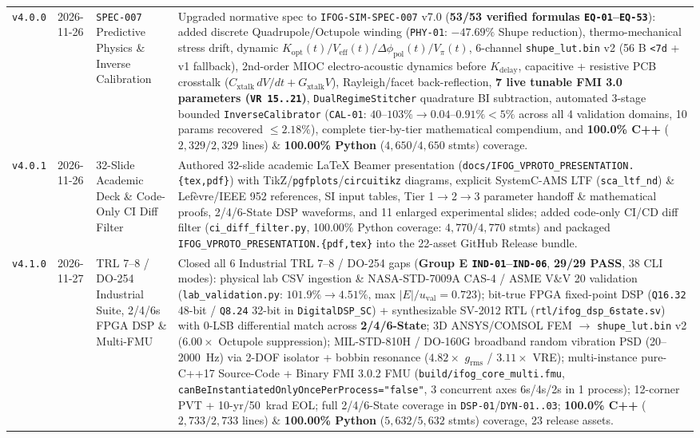 \documentclass[11pt,a4paper]{article}
\begin{document}
\begin{tabularx}{\textwidth}{@{}p{1.4cm} p{2.0cm} p{3.2cm} X@{}}
\texttt{v4.0.0} & 2026-11-26 & \texttt{SPEC-007} Predictive Physics \& Inverse Calibration & Upgraded normative spec to \texttt{IFOG-SIM-SPEC-007} v7.0 (\textbf{53/53 verified formulas \texttt{EQ-01}--\texttt{EQ-53}}): added discrete Quadrupole/Octupole winding (\texttt{PHY-01}: $-47.69\%$ Shupe reduction), thermo-mechanical stress drift, dynamic $K_{\text{opt}}(t)/V_{\text{eff}}(t)/\Delta\phi_{\text{pol}}(t)/V_\pi(t)$, 6-channel \texttt{shupe\_lut.bin} v2 (56 B \texttt{<7d} + v1 fallback), 2nd-order MIOC electro-acoustic dynamics before $K_{\text{delay}}$, capacitive + resistive PCB crosstalk ($C_{\text{xtalk}}\,dV/dt + G_{\text{xtalk}}V$), Rayleigh/facet back-reflection, \textbf{7 live tunable FMI 3.0 parameters (\texttt{VR 15..21})}, \texttt{DualRegimeStitcher} quadrature BI subtraction, automated 3-stage bounded \texttt{InverseCalibrator} (\texttt{CAL-01}: $40$--$103\% \to 0.04$--$0.91\% < 5\%$ across all 4 validation domains, 10 params recovered $\le 2.18\%$), complete tier-by-tier mathematical compendium, and \textbf{100.0\% C++} ($2{,}329/2{,}329$ lines) \& \textbf{100.00\% Python} ($4{,}650/4{,}650$ stmts) coverage. \\
\texttt{v4.0.1} & 2026-11-26 & 32-Slide Academic Deck \& Code-Only CI Diff Filter & Authored 32-slide academic LaTeX Beamer presentation (\texttt{docs/IFOG\_VPROTO\_PRESENTATION.\{tex,pdf\}}) with TikZ/\texttt{pgfplots}/\texttt{circuitikz} diagrams, explicit SystemC-AMS LTF (\texttt{sca\_ltf\_nd}) \& Lefèvre/IEEE 952 references, SI input tables, Tier 1$\to$2$\to$3 parameter handoff \& mathematical proofs, 2/4/6-State DSP waveforms, and 11 enlarged experimental slides; added code-only CI/CD diff filter (\texttt{ci\_diff\_filter.py}, 100.00\% Python coverage: $4{,}770/4{,}770$ stmts) and packaged \texttt{IFOG\_VPROTO\_PRESENTATION.\{pdf,tex\}} into the 22-asset GitHub Release bundle. \\
\texttt{v4.1.0} & 2026-11-27 & TRL 7--8 / DO-254 Industrial Suite, 2/4/6s FPGA DSP \& Multi-FMU & Closed all 6 Industrial TRL 7--8 / DO-254 gaps (\textbf{Group E \texttt{IND-01}--\texttt{IND-06}}, \textbf{29/29 PASS}, 38 CLI modes): physical lab CSV ingestion \& NASA-STD-7009A CAS-4 / ASME V\&V 20 validation (\texttt{lab\_validation.py}: $101.9\% \to 4.51\%$, max $|E|/u_{\text{val}} = 0.723$); bit-true FPGA fixed-point DSP (\texttt{Q16.32} 48-bit / \texttt{Q8.24} 32-bit in \texttt{DigitalDSP\_SC}) + synthesizable SV-2012 RTL (\texttt{rtl/ifog\_dsp\_6state.sv}) with 0-LSB differential match across \textbf{2/4/6-State}; 3D ANSYS/COMSOL FEM $\to$ \texttt{shupe\_lut.bin} v2 ($6.00\times$ Octupole suppression); MIL-STD-810H / DO-160G broadband random vibration PSD (20--2000~Hz) via 2-DOF isolator + bobbin resonance ($4.82\times$ $g_{\text{rms}}$ / $3.11\times$ VRE); multi-instance pure-C++17 Source-Code + Binary FMI 3.0.2 FMU (\texttt{build/ifog\_core\_multi.fmu}, \texttt{canBeInstantiatedOnlyOncePerProcess="false"}, 3 concurrent axes 6s/4s/2s in 1 process); 12-corner PVT + 10-yr/50~krad EOL; full 2/4/6-State coverage in \texttt{DSP-01}/\texttt{DYN-01..03}; \textbf{100.0\% C++} ($2{,}733/2{,}733$ lines) \& \textbf{100.00\% Python} ($5{,}632/5{,}632$ stmts) coverage, 23 release assets. \\
\bottomrule
\end{tabularx}
\end{document}
